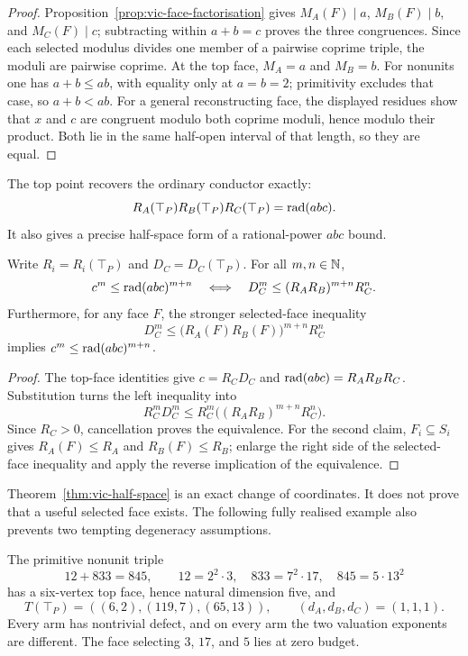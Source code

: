 \begin{proof}
Proposition~\ref{prop:vic-face-factorisation} gives
$M_A(F)\mid a$, $M_B(F)\mid b$, and $M_C(F)\mid c$; subtracting within
$a+b=c$ proves the three congruences.  Since each selected modulus divides
one member of a pairwise coprime triple, the moduli are pairwise coprime.
At the top face, $M_A=a$ and $M_B=b$.  For nonunits one has
$a+b\le ab$, with equality only at $a=b=2$; primitivity excludes that case,
so $a+b<ab$.
For a general reconstructing face, the displayed residues show that $x$ and
$c$ are congruent modulo both coprime moduli, hence modulo their product.
Both lie in the same half-open interval of that length, so they are equal.
\end{proof}

The top point recovers the ordinary conductor exactly:
\[
 R_A(\top_P)R_B(\top_P)R_C(\top_P)=\operatorname{rad}(abc).
\]
It also gives a precise half-space form of a rational-power $abc$ bound.

\begin{theorem}\label{thm:vic-half-space}
Write $R_i=R_i(\top_P)$ and $D_C=D_C(\top_P)$.  For all $m,n\in\mathbb N$,
\[
 c^m\le\operatorname{rad}(abc)^{m+n}
 \quad\Longleftrightarrow\quad
 D_C^m\le (R_AR_B)^{m+n}R_C^n.
\]
Furthermore, for any face $F$, the stronger selected-face inequality
\[
 D_C^m\le
 \bigl(R_A(F)R_B(F)\bigr)^{m+n}R_C^n
\]
implies $c^m\le\operatorname{rad}(abc)^{m+n}$.
\end{theorem}

\begin{proof}
The top-face identities give $c=R_CD_C$ and
$\operatorname{rad}(abc)=R_AR_BR_C$.  Substitution turns the left inequality into
\[
 R_C^mD_C^m\le
 R_C^m\bigl((R_AR_B)^{m+n}R_C^n\bigr).
\]
Since $R_C>0$, cancellation proves the equivalence.  For the second claim,
$F_i\subseteq S_i$ gives $R_A(F)\le R_A$ and $R_B(F)\le R_B$; enlarge the
right side of the selected-face inequality and apply the reverse implication
of the equivalence.
\end{proof}

Theorem~\ref{thm:vic-half-space} is an exact change of coordinates.  It does
not prove that a useful selected face exists.  The following fully realised
example also prevents two tempting degeneracy assumptions.

\begin{proposition}
The primitive nonunit triple
\[
 12+833=845,\qquad
 12=2^2\cdot3,\quad 833=7^2\cdot17,\quad 845=5\cdot13^2
\]
has a six-vertex top face, hence natural dimension five, and
\[
 T(\top_P)=((6,2),(119,7),(65,13)),\qquad
 (d_A,d_B,d_C)=(1,1,1).
\]
Every arm has nontrivial defect, and on every arm the two valuation exponents
are different.  The face selecting $3$, $17$, and $5$ lies at zero budget.
\end{proposition}


